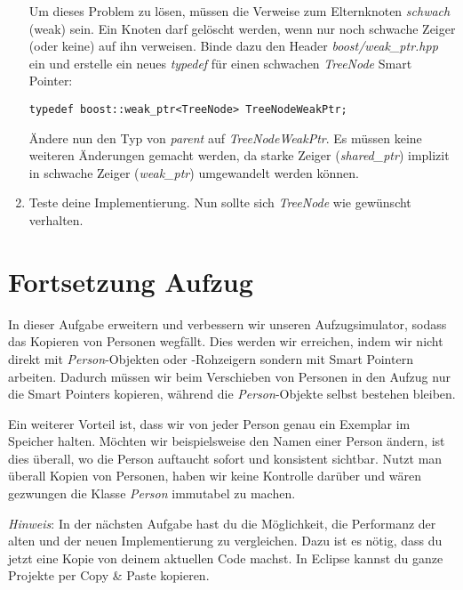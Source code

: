 \begin{enumerate}
Um dieses Problem zu lösen, müssen die Verweise zum Elternknoten \emph{schwach} (weak) sein.
Ein Knoten darf gelöscht werden, wenn nur noch schwache Zeiger (oder keine) auf ihn verweisen.
Binde dazu den Header \emph{boost/weak\_ptr.hpp} ein und erstelle ein neues \emph{typedef} für einen schwachen \emph{TreeNode} Smart Pointer:

\begin{lstlisting}
typedef boost::weak_ptr<TreeNode> TreeNodeWeakPtr;
\end{lstlisting}

Ändere nun den Typ von \emph{parent} auf \emph{TreeNodeWeakPtr}.
Es müssen keine weiteren Änderungen gemacht werden, da starke Zeiger (\emph{shared\_ptr}) implizit in schwache Zeiger (\emph{weak\_ptr}) umgewandelt werden können.

\item
Teste deine Implementierung.
Nun sollte sich \emph{TreeNode} wie gewünscht verhalten.

\end{enumerate}



\section{Fortsetzung Aufzug}
In dieser Aufgabe erweitern und verbessern wir unseren Aufzugsimulator, sodass das Kopieren von Personen wegfällt.
Dies werden wir erreichen, indem wir nicht direkt mit \emph{Person}-Objekten oder -Rohzeigern sondern mit Smart Pointern arbeiten.
Dadurch müssen wir beim Verschieben von Personen in den Aufzug nur die Smart Pointers kopieren, während die \emph{Person}-Objekte selbst bestehen bleiben.

Ein weiterer Vorteil ist, dass wir von jeder Person genau ein Exemplar im Speicher halten.
Möchten wir beispielsweise den Namen einer Person ändern, ist dies überall, wo die Person auftaucht sofort und konsistent sichtbar.
Nutzt man überall Kopien von Personen, haben wir keine Kontrolle darüber und wären gezwungen die Klasse \emph{Person} immutabel zu machen.

\emph{Hinweis}:
In der nächsten Aufgabe hast du die Möglichkeit, die Performanz der alten und der neuen Implementierung zu vergleichen.
Dazu ist es nötig, dass du jetzt eine Kopie von deinem aktuellen Code machst.
In Eclipse kannst du ganze Projekte per Copy \& Paste kopieren.

